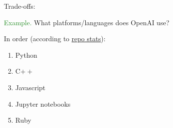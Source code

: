 \documentclass[
    xcolor={svgnames,dvipsnames},
    hyperref={colorlinks, citecolor=DeepPink4, linkcolor=DarkRed, urlcolor=DarkBlue}
    ]{beamer}  %
\newcommand{\Eg}{\textcolor{ForestGreen}{Example. }}
\newcommand{\1}{\mathbbm 1}
\begin{document}
\begin{frame}

    Trade-offs:

    \begin{figure}
       \begin{center}
       \end{center}
    \end{figure}

\end{frame}





\begin{frame}

    \Eg What platforms/languages does OpenAI use?

        \vspace{0.5em}
    In order (according to  \href{https://github.com/openai}{repo stats}):

    \begin{enumerate}
        \item Python
        \item C$++$
        \item Javascript
        \item Jupyter notebooks
        \item Ruby
    \end{enumerate}

\end{frame}



\end{document}
